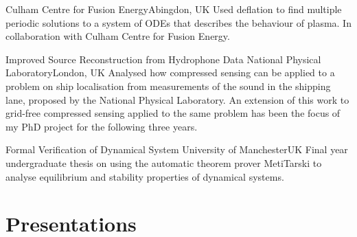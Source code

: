 \documentclass[11pt,a4paper,roman]{moderncv} %
\begin{document}
        {Culham Centre for Fusion Energy}{Abingdon, UK}{}{
          Used deflation to find multiple periodic solutions to a 
          system of ODEs that describes the behaviour of plasma.
          In collaboration with Culham Centre for Fusion Energy.
        }


        {Improved Source Reconstruction from Hydrophone Data}
        {National Physical Laboratory}{London, UK}{}{
          Analysed how compressed sensing 
          can be applied to a problem on ship localisation
          from measurements of the sound in the shipping lane, 
          proposed by the National Physical Laboratory. An extension of this work 
          to grid-free compressed sensing applied to the same problem 
          has been the focus of my PhD project for the following three years.
        }


        {Formal Verification of Dynamical System}
        {University of Manchester}{UK}{}{
          Final year undergraduate thesis on using the automatic theorem 
          prover MetiTarski to analyse equilibrium and stability properties 
          of dynamical systems.
        }



\section{Presentations}


\end{document}
